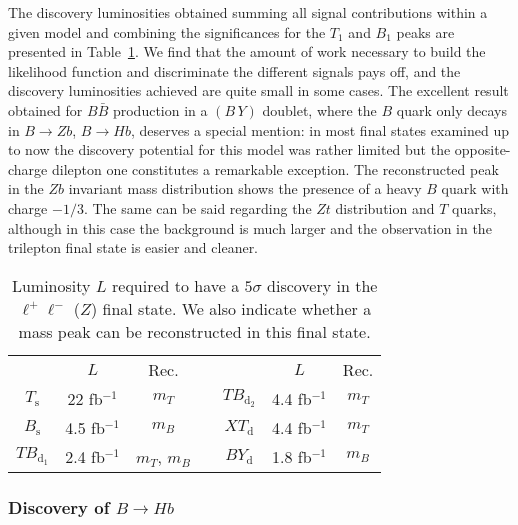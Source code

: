 \documentclass[12pt,a4paper]{article}
\newcommand{\fbin}{fb$^{-1}$}
\newcommand{\BB}{B \bar B}
\newcommand{\Ts}{T_\text{s}}
\newcommand{\Bs}{B_\text{s}}
\newcommand{\TBd}{TB_{\text{d}_1}}
\newcommand{\TBD}{TB_{\text{d}_2}}
\newcommand{\XTd}{XT_\text{d}}
\newcommand{\BYd}{BY_\text{d}}
\newcommand{\BY}{(B \, Y)}
\begin{document}
%
The discovery luminosities obtained summing all signal contributions within a given model and combining the significances for the $T_1$ and $B_1$ peaks are presented in Table~\ref{tab:sig-2Q0-Z}. We find that the amount of work necessary to build the likelihood function and discriminate the different signals pays off, and the discovery luminosities achieved are quite small in some cases.
The excellent result obtained for $\BB$ production in a $\BY$ doublet, where the $B$ quark only decays in $B \to Zb$, $B \to Hb$, deserves a special mention: in most final states examined up to now the discovery potential for this model was rather limited but the opposite-charge dilepton one constitutes a remarkable exception. The reconstructed peak in the $Zb$ invariant mass distribution shows the presence of a heavy $B$ quark with charge $-1/3$. The same can be said regarding the $Zt$ distribution and $T$ quarks, although in this case the background is much larger and the observation in the trilepton final state is easier and cleaner.

\begin{table}[t]
\begin{center}
\begin{tabular}{ccccccc}
       & $L$      & Rec. & \quad &        & $L$       & Rec. \\[1mm]
$\Ts$  & 22  \fbin  & $m_T$   &       & $\TBD$ & 4.4 \fbin & $m_T$ \\
$\Bs$  & 4.5 \fbin & $m_B$   &       & $\XTd$ & 4.4 \fbin & $m_T$ \\
$\TBd$ & 2.4 \fbin & $m_T$, $m_B$    &       & $\BYd$ & 1.8 \fbin    & $m_B$
\end{tabular}
\end{center}
\caption{Luminosity $L$ required to have a $5\sigma$ discovery in the $\ell^+ \ell^-$ ($Z$) final state. We also indicate whether a mass peak can be reconstructed in this final state.}
\label{tab:sig-2Q0-Z}
\end{table}



\subsubsection{Discovery of $B \to Hb$}
\end{document}
